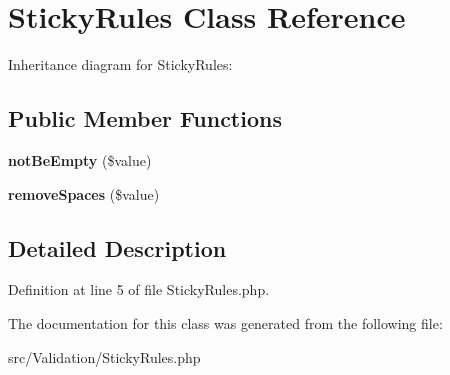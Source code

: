 \hypertarget{class_zest_1_1_validation_1_1_sticky_rules}{}\section{Sticky\+Rules Class Reference}
\label{class_zest_1_1_validation_1_1_sticky_rules}


Inheritance diagram for Sticky\+Rules\+:
\subsection*{Public Member Functions}
\begin{DoxyCompactItemize}
\item 
\mbox{\label{class_zest_1_1_validation_1_1_sticky_rules_aa9c07c9f28d66180575e088fe4b85b20}} 
{\bfseries not\+Be\+Empty} (\$value)
\item 
\mbox{\label{class_zest_1_1_validation_1_1_sticky_rules_ab69596a77536131d561f9de1657948d0}} 
{\bfseries remove\+Spaces} (\$value)
\end{DoxyCompactItemize}


\subsection{Detailed Description}


Definition at line 5 of file Sticky\+Rules.\+php.



The documentation for this class was generated from the following file\+:\begin{DoxyCompactItemize}
\item 
src/\+Validation/Sticky\+Rules.\+php\end{DoxyCompactItemize}
